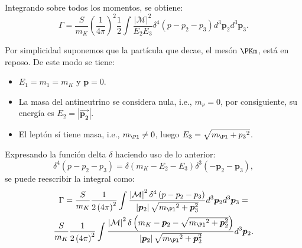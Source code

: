 Integrando sobre todos los momentos, se obtiene:
\begin{equation}
\Gamma =\dfrac{S}{m_{K}}\left( \dfrac{1}{4\pi }\right) ^{2}\dfrac{1}{2}\int \dfrac{\left| \mathcal{M}\right| ^{2}}{E_{2}E_{3}}\delta ^{4}\left( p-p_{2}-p_{3}\right) d^{3}\boldsymbol{p}_{2}d^{3}\boldsymbol{p}_{3} .
\end{equation}

Por simplicidad suponemos que la partícula que decae, el mesón $\PKm$, está en reposo. De este modo se tiene:
\begin{itemize}
\item $E_1=m_1=m_K$ y $\boldsymbol{p}=0$.
\item La masa del antineutrino se considera nula, i.e., $m_{\nu}=0$, por consiguiente, su energía es $E_2=|\vec{\boldsymbol{p_2}}|$.
\item El leptón sí tiene masa, i.e., $m_{\Pl} \neq 0$, luego $E_3=\sqrt{m_{\Pl}+{p_{3}}^2}$.
\end{itemize}

Expresando la función delta $\delta$ haciendo uso de lo anterior:
\begin{equation}
\delta ^{4}\left( p-p_{2}-p_{3}\right) =\delta \left( m_{K}-E_{2}-E_{3}\right) \delta ^{3}\left( -\boldsymbol{p}_{2}-\boldsymbol{p}_{3}\right) ,
\end{equation}
se puede reescribir la integral como:
\begin{multline}
\Gamma =\dfrac{S}{m_{K}}\dfrac{1}{2\left( 4\pi \right) ^{2}}\int \dfrac{\left|\mathcal{M}\right| ^{2}\delta ^{4}\left( p-p_{2}-p_{3}\right) }{\left| \boldsymbol{p}_{2}\right| \sqrt{{m_{\Pl}}^{2}+\boldsymbol{p}_{3} ^{2}}} d^{3}\boldsymbol{p}_{2} d^{3}\boldsymbol{p}_{3} = \\ \dfrac{S}{m_{K}}\dfrac{1}{2\left( 4\pi \right) ^{2}}\int \dfrac{\left|\mathcal{M}\right| ^{2}\delta\left(m_{K}-\boldsymbol{p}_{2}-\sqrt{{m_{\Pl}}^{2}+\boldsymbol{p}_{2} ^{2}}\right)}{ \left| \boldsymbol{p}_{2}\right| \sqrt{{m_{\Pl}}^{2}+\boldsymbol{p}_{2} ^{2}}} d^{3}\boldsymbol{p}_{2} .
\end{multline}

